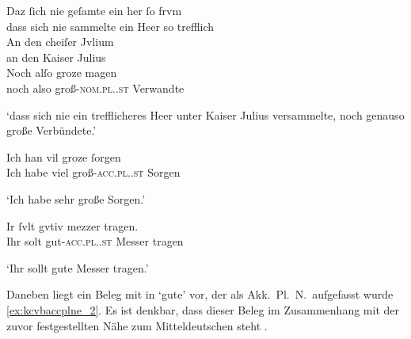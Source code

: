 \begin{exe}
\ex \label{ex:kcvbregel}
	\begin{xlist}
	\ex \label{ex:kcvbregel_1}
		\gll Daz ſich nie geſamte ein her ſo frvm \\
			dass sich nie sammelte ein Heer so trefflich \\
	\sn \gll An den cheiſer Jvlium \\
			an den Kaiser Julius \\
	\sn \gll Noch alſo groze magen \\
			noch also groß-\textsc{nom.pl.\MascM.st} Verwandte \\
		\begin{taggedline}{\parencites[\pno~95\rb, 5--7]{kc:VB}[vgl.][14035--14036]{schroeder1895}}
		\trans `dass sich nie ein trefflicheres Heer unter Kaiser Julius 
			versammelte, noch genauso große Verbündete.'
		\end{taggedline}

	\ex \label{ex:kcvbregel_2}
		\gll Ich han vil groze ſorgen \\
			Ich habe viel groß-\textsc{acc.pl.\FemI.st} Sorgen \\
		\begin{taggedline}{\parencites[\pno~92\va, 22]{kc:VB}[zu][13514]{schroeder1895}}
		\trans `Ich habe sehr große Sorgen.'
		\end{taggedline}

	\ex \label{ex:kcvbregel_3}
		\gll Ir ſvlt gvtiv mezzer tragen. \\
			Ihr solt gut-\textsc{acc.pl.\NeutI.st} Messer tragen \\
		\begin{taggedline}{\parencites[\pno~24\va, 23]{kc:VB}[vgl.][4944]{schroeder1895}}
		\trans `Ihr sollt gute Messer tragen.'
		\end{taggedline}
	\end{xlist}
\end{exe}

Daneben liegt ein Beleg mit  in  `gute' vor, der als
Akk.\ Pl.\ N.\ aufgefasst wurde \cref{ex:kcvbaccplne_2}. Es ist denkbar, dass
dieser Beleg im Zusammenhang mit der zuvor festgestellten Nähe zum
Mitteldeutschen steht \autocites(siehe auch
\cref{phsec:vbherkunft})[vgl.][181--184]{ksw2}.

